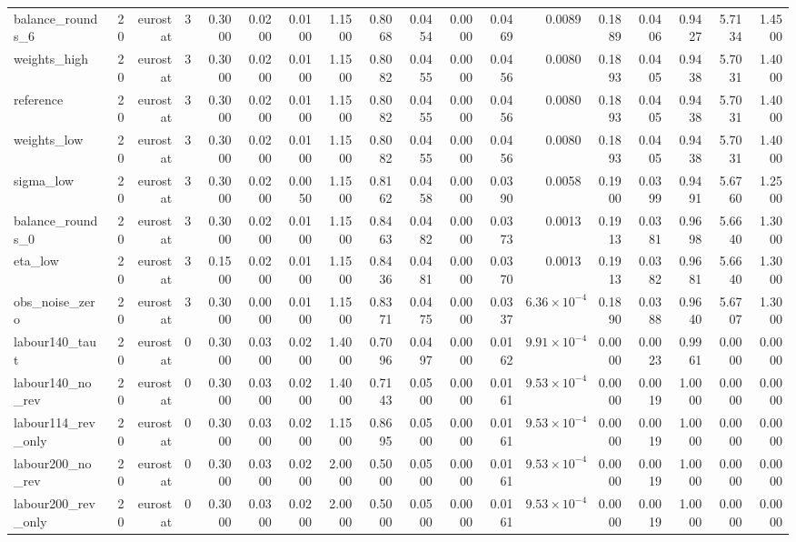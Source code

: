 \begin{table}[htbp]
\begin{tabular}{lrrrrrrrrrrrrrrrrr}
balance\_rounds\_6 & 20 & eurostat & 3 & 0.3000 & 0.0200 & 0.0100 & 1.1500 & 0.8068 & 0.0454 & 0.0000 & 0.0469 & 0.0089 & 0.1889 & 0.0406 & 0.9427 & 5.7134 & 1.4500 \\
weights\_high & 20 & eurostat & 3 & 0.3000 & 0.0200 & 0.0100 & 1.1500 & 0.8082 & 0.0455 & 0.0000 & 0.0456 & 0.0080 & 0.1893 & 0.0405 & 0.9438 & 5.7031 & 1.4000 \\
reference & 20 & eurostat & 3 & 0.3000 & 0.0200 & 0.0100 & 1.1500 & 0.8082 & 0.0455 & 0.0000 & 0.0456 & 0.0080 & 0.1893 & 0.0405 & 0.9438 & 5.7031 & 1.4000 \\
weights\_low & 20 & eurostat & 3 & 0.3000 & 0.0200 & 0.0100 & 1.1500 & 0.8082 & 0.0455 & 0.0000 & 0.0456 & 0.0080 & 0.1893 & 0.0405 & 0.9438 & 5.7031 & 1.4000 \\
sigma\_low & 20 & eurostat & 3 & 0.3000 & 0.0200 & 0.0050 & 1.1500 & 0.8162 & 0.0458 & 0.0000 & 0.0390 & 0.0058 & 0.1900 & 0.0399 & 0.9491 & 5.6760 & 1.2500 \\
balance\_rounds\_0 & 20 & eurostat & 3 & 0.3000 & 0.0200 & 0.0100 & 1.1500 & 0.8463 & 0.0482 & 0.0000 & 0.0373 & 0.0013 & 0.1913 & 0.0381 & 0.9698 & 5.6640 & 1.3000 \\
eta\_low & 20 & eurostat & 3 & 0.1500 & 0.0200 & 0.0100 & 1.1500 & 0.8436 & 0.0481 & 0.0000 & 0.0370 & 0.0013 & 0.1913 & 0.0382 & 0.9681 & 5.6640 & 1.3000 \\
obs\_noise\_zero & 20 & eurostat & 3 & 0.3000 & 0.0000 & 0.0100 & 1.1500 & 0.8371 & 0.0475 & 0.0000 & 0.0337 & $6.36\times10^{-4}$ & 0.1890 & 0.0388 & 0.9640 & 5.6707 & 1.3000 \\
labour140\_taut & 20 & eurostat & 0 & 0.3000 & 0.0300 & 0.0200 & 1.4000 & 0.7096 & 0.0497 & 0.0000 & 0.0162 & $9.91\times10^{-4}$ & 0.0000 & 0.0023 & 0.9961 & 0.0000 & 0.0000 \\
labour140\_no\_rev & 20 & eurostat & 0 & 0.3000 & 0.0300 & 0.0200 & 1.4000 & 0.7143 & 0.0500 & 0.0000 & 0.0161 & $9.53\times10^{-4}$ & 0.0000 & 0.0019 & 1.0000 & 0.0000 & 0.0000 \\
labour114\_rev\_only & 20 & eurostat & 0 & 0.3000 & 0.0300 & 0.0200 & 1.1500 & 0.8695 & 0.0500 & 0.0000 & 0.0161 & $9.53\times10^{-4}$ & 0.0000 & 0.0019 & 1.0000 & 0.0000 & 0.0000 \\
labour200\_no\_rev & 20 & eurostat & 0 & 0.3000 & 0.0300 & 0.0200 & 2.0000 & 0.5000 & 0.0500 & 0.0000 & 0.0161 & $9.53\times10^{-4}$ & 0.0000 & 0.0019 & 1.0000 & 0.0000 & 0.0000 \\
labour200\_rev\_only & 20 & eurostat & 0 & 0.3000 & 0.0300 & 0.0200 & 2.0000 & 0.5000 & 0.0500 & 0.0000 & 0.0161 & $9.53\times10^{-4}$ & 0.0000 & 0.0019 & 1.0000 & 0.0000 & 0.0000 \\

\end{tabular}
\end{table}
